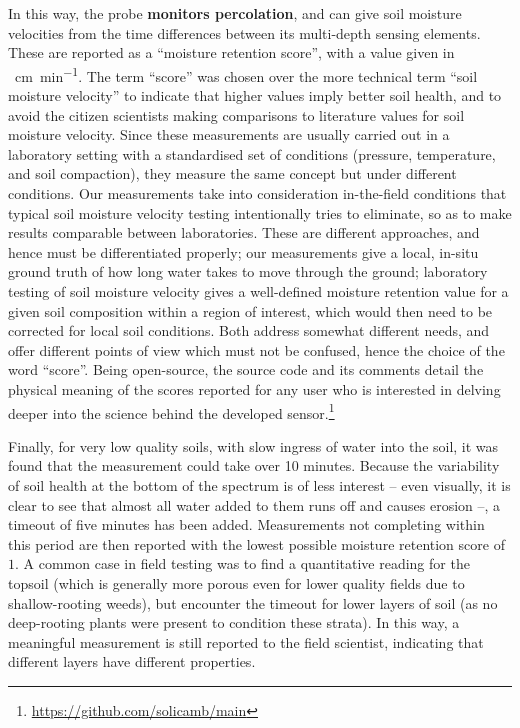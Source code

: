 In this way, the probe \textbf{monitors percolation}, and can give soil moisture velocities from the time differences between its multi-depth sensing elements. These are reported as a \enquote{moisture retention score}, with a value given in \SI{}{\centi\meter\per\minute}. The term \enquote{score} was chosen over the more technical term \enquote{soil moisture velocity}\cite{soilmoisturevelocityogdenetal2017,soilwaterretentionbuitenwerfetal2014} to indicate that higher values imply better soil health, and to avoid the citizen scientists making comparisons to literature values for soil moisture velocity. Since these measurements are usually carried out in a laboratory setting with a standardised set of conditions (pressure, temperature, and soil compaction), they measure the same concept but under different conditions.\cite{soilmoisturevelocityogdenetal2017} Our measurements take into consideration in-the-field conditions that typical soil moisture velocity testing intentionally tries to eliminate, so as to make results comparable between laboratories. These are different approaches, and hence must be differentiated properly; our measurements give a local, in-situ ground truth of how long water takes to move through the ground; laboratory testing of soil moisture velocity gives a well-defined moisture retention value for a given soil composition within a region of interest, which would then need to be corrected for local soil conditions. Both address somewhat different needs, and offer different points of view which must not be confused, hence the choice of the word \enquote{score}. Being open-source, the source code and its comments detail the physical meaning of the scores reported for any user who is interested in delving deeper into the science behind the developed sensor.\footnote{\url{https://github.com/solicamb/main}}

Finally, for very low quality soils, with slow ingress of water into the soil, it was found that the measurement could take over 10 minutes. Because the variability of soil health at the bottom of the spectrum is of less interest -- even visually, it is clear to see that almost all water added to them runs off and causes erosion --, a timeout of five minutes has been added. Measurements not completing within this period are then reported with the lowest possible moisture retention score of $1$. A common case in field testing was to find a quantitative reading for the topsoil (which is generally more porous even for lower quality fields due to shallow-rooting weeds), but encounter the timeout for lower layers of soil (as no deep-rooting plants were present to condition these strata). In this way, a meaningful measurement is still reported to the field scientist, indicating that different layers have different properties.

